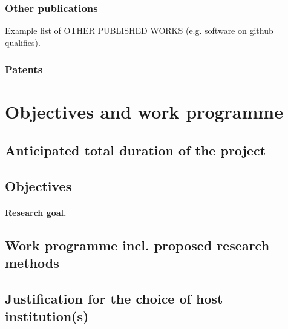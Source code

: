 \documentclass[11pt]{article}
\begin{document}
\makeatletter
\renewcommand\@biblabel[1]{}
\makeatother



\vspace{-1ex}\subsubsection{Other publications}
\vspace{-1ex}  Example list of OTHER PUBLISHED WORKS (e.g. software on github qualifies).


\vspace{-1ex}\subsubsection{Patents } 

\section{Objectives and work programme}

\vspace{-1ex}\subsection{Anticipated total duration of the project}

\vspace{-1ex}\subsection{Objectives}

\vspace{-1ex}\paragraph{Research goal.}

\vspace{-1ex}\subsection{Work programme incl. proposed research methods}

\vspace{-1ex}\subsection{Justification for the choice of host institution(s)}
\end{document}
